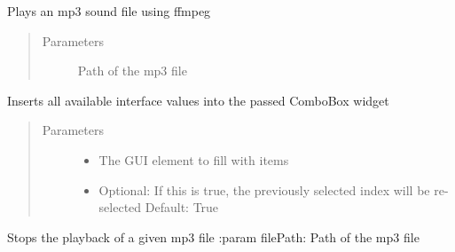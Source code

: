 \documentclass[letterpaper,10pt,english]{sphinxmanual}
\begin{document}
\begin{fulllineitems}

\begin{fulllineitems}
\label{\detokenize{src:src.Toolbox.Toolbox.playMP3}}
Plays an mp3 sound file using ffmpeg
\begin{quote}\begin{description}
\item[{Parameters}] \leavevmode
{} \textendash{} Path of the mp3 file

\end{description}\end{quote}

\end{fulllineitems}


\begin{fulllineitems}
\label{\detokenize{src:src.Toolbox.Toolbox.populateInterfaceComboBox}}
Inserts all available interface values into the passed ComboBox widget
\begin{quote}\begin{description}
\item[{Parameters}] \leavevmode\begin{itemize}
\item {} 
 \textendash{} The GUI element to fill with items

\item {} 
 \textendash{} Optional: If this is true, the previously selected index will be re-selected
Default: True

\end{itemize}

\end{description}\end{quote}

\end{fulllineitems}


\begin{fulllineitems}
\label{\detokenize{src:src.Toolbox.Toolbox.stopMP3}}
Stops the playback of a given mp3 file
:param filePath: Path of the mp3 file


\end{fulllineitems}
\end{fulllineitems}
\end{document}
